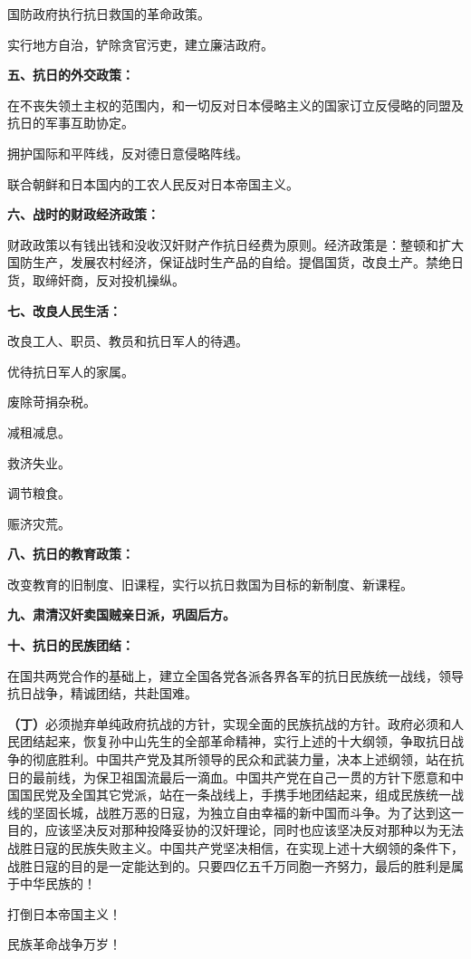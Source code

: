 国防政府执行抗日救国的革命政策。

实行地方自治，铲除贪官污吏，建立廉洁政府。


\textbf{五、抗日的外交政策：}

在不丧失领土主权的范围内，和一切反对日本侵略主义的国家订立反侵略的同盟及抗日的军事互助协定。

拥护国际和平阵线，反对德日意侵略阵线。

联合朝鲜和日本国内的工农人民反对日本帝国主义。


\textbf{六、战时的财政经济政策：}

财政政策以有钱出钱和没收汉奸财产作抗日经费为原则。经济政策是：整顿和扩大国防生产，发展农村经济，保证战时生产品的自给。提倡国货，改良土产。禁绝日货，取缔奸商，反对投机操纵。


\textbf{七、改良人民生活：}

改良工人、职员、教员和抗日军人的待遇。

优待抗日军人的家属。

废除苛捐杂税。

减租减息。

救济失业。

调节粮食。

赈济灾荒。


\textbf{八、抗日的教育政策：}

改变教育的旧制度、旧课程，实行以抗日救国为目标的新制度、新课程。


\textbf{九、肃清汉奸卖国贼亲日派，巩固后方。}

\textbf{十、抗日的民族团结：}

在国共两党合作的基础上，建立全国各党各派各界各军的抗日民族统一战线，领导抗日战争，精诚团结，共赴国难。

\textbf{（丁）}必须抛弃单纯政府抗战的方针，实现全面的民族抗战的方针。政府必须和人民团结起来，恢复孙中山先生的全部革命精神，实行上述的十大纲领，争取抗日战争的彻底胜利。中国共产党及其所领导的民众和武装力量，决本上述纲领，站在抗日的最前线，为保卫祖国流最后一滴血。中国共产党在自己一贯的方针下愿意和中国国民党及全国其它党派，站在一条战线上，手携手地团结起来，组成民族统一战线的坚固长城，战胜万恶的日寇，为独立自由幸福的新中国而斗争。为了达到这一目的，应该坚决反对那种投降妥协的汉奸理论，同时也应该坚决反对那种以为无法战胜日寇的民族失败主义。中国共产党坚决相信，在实现上述十大纲领的条件下，战胜日寇的目的是一定能达到的。只要四亿五千万同胞一齐努力，最后的胜利是属于中华民族的！

打倒日本帝国主义！

民族革命战争万岁！

